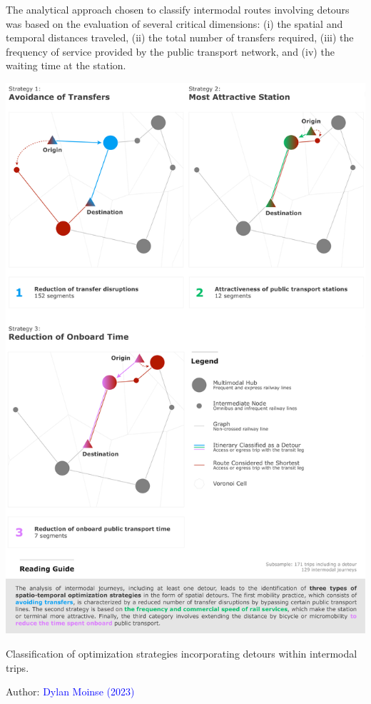\begin{refsegment}
The analytical approach chosen to classify intermodal routes involving detours was based on the evaluation of several critical dimensions: (i) the spatial and temporal distances traveled, (ii) the total number of transfers required, (iii) the frequency of service provided by the public transport network, and (iv) the waiting time at the station. %

    \begin{carte}[h!]\vspace*{4pt}
        \centerline{\includegraphics[width=1\columnwidth]{src/Figures/Chap-5/EN_Detours_Typologie.pdf}}
        \caption{Classification of optimization strategies incorporating detours within intermodal trips.}
        \label{fig-chap5:classification-strategies-optimisation-detours}
        \vspace{5pt}
        \begin{flushright}\scriptsize{
        Author: \textcolor{blue}{Dylan Moinse (2023)}
        }\end{flushright}
    \end{carte}


\end{refsegment}
